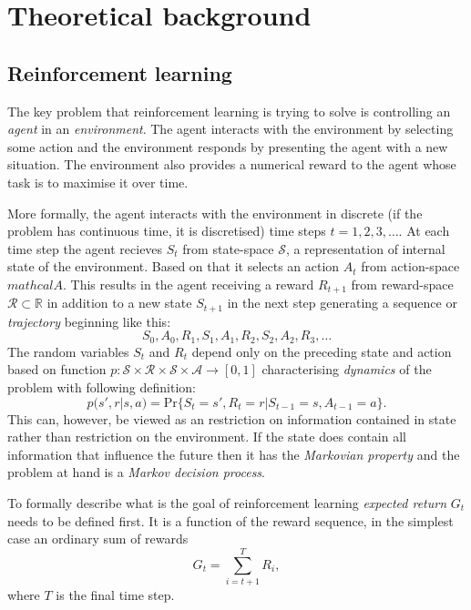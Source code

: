 \chapter{Theoretical background}


\section{Reinforcement learning}
\label{sec:reinf}
The key problem that reinforcement learning is trying to solve is controlling an \emph{agent} in an \emph{environment}. The agent interacts with the environment by selecting some action and the environment responds by presenting the agent with a new situation. The environment also provides a numerical reward to the agent whose task is to maximise it over time.

More formally, the agent interacts with the environment in discrete (if the problem has continuous time, it is discretised) time steps $t=1,2,3,\dots$. At each time step the agent recieves $S_t$ from state-space $\mathcal{S}$, a representation of internal state of the environment. Based on that it selects an action $A_t$ from action-space $mathcal{A}$. This results in the agent receiving a reward $R_{t+1}$ from reward-space $\mathcal{R}\subset \mathbb{R}$ in addition to a new state $S_{t+1}$ in the next step generating a sequence or \emph{trajectory} beginning like this:
\begin{equation}
    S_0,A_0,R_1,S_1,A_1,R_2,S_2,A_2,R_3,\dots
\end{equation}
The random variables $S_t$ and $R_t$ depend only on the preceding state and action based on function $p: \mathcal{S} \times \mathcal{R} \times \mathcal{S} \times\mathcal{A} \rightarrow [0,1]$ characterising \emph{dynamics} of the problem with following definition:
\begin{equation}
    p(s',r|s,a) = \text{Pr}\{S_t=s',R_t=r|S_{t-1}=s, A_{t-1}=a\}.
\end{equation}
This can, however, be viewed as an restriction on information contained in state rather than restriction on the environment. If the state does contain all information that influence the future then it has the \emph{Markovian property} and the problem at hand is a \emph{Markov decision process}.

To formally describe what is the goal of reinforcement learning \emph{expected return} $G_t$ needs to be defined first. It is a function of the reward sequence, in the simplest case an ordinary sum of rewards 
\begin{equation}
    \label{eq:exp-ret}
    G_t = \sum_{i=t+1}^TR_i,
\end{equation}
where $T$ is the final time step. 

